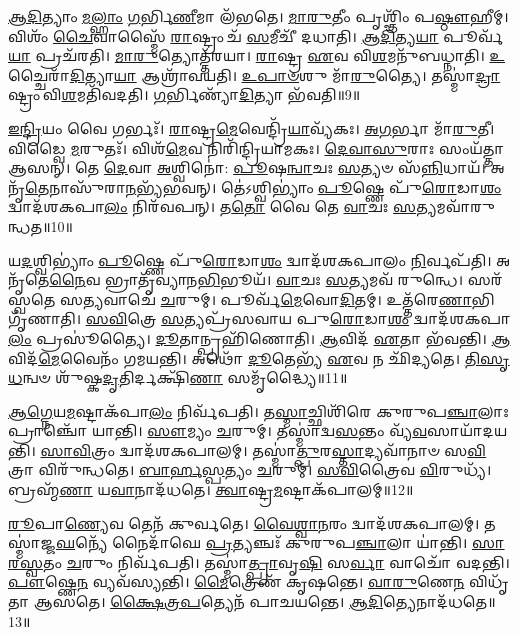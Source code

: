 \-\ul{𑌆}\-\-\ul{𑌦𑌿}\-𑌤𑍍𑌯𑌾𑌂 \ul{𑌮}\-\-\ul{𑌲𑍍}\-𑌹𑌾𑌂 \ul{𑌗}\-𑌰𑍍𑌭𑌿\-\ul{𑌣𑍀}\-𑌮𑌾 𑌲᳴𑌭𑌤𑍇।
\-\ul{𑌮𑌾}\-\-\ul{𑌰𑍁}\-𑌤𑍀𑌂 𑌪𑍃𑌶𑍍𑌞𑌿𑌂᳴ 𑌪\-\ul{𑌷𑍍𑌠𑍗}\-𑌹𑍀𑌮𑍍।
𑌵𑌿𑌶𑌂᳴ \ul{𑌚𑍈}\-𑌵𑌾𑌸𑍍𑌮𑍈᳴ \ul{𑌰𑌾}\-𑌷𑍍𑌟𑍍𑌰𑌂 𑌚᳴ \ul{𑌸}\-𑌮𑍀𑌚𑍀᳴ 𑌦𑌧𑌾𑌤𑌿।
\-\ul{𑌆}\-\-\ul{𑌦𑌿}\-𑌤𑍍𑌯\-\ul{𑌯𑌾} 𑌪𑍂𑌰𑍍𑌵᳴\-\ul{𑌯𑌾} 𑌪𑍍𑌰𑌚᳴𑌰𑌤𑌿।
\-\ul{𑌮𑌾}\-\-\ul{𑌰𑍁}\-𑌤𑍍𑌯𑍋𑌤𑍍𑌤᳴𑌰𑌯𑌾।
\-\ul{𑌰𑌾}\-𑌷𑍍𑌟𑍍𑌰 \ul{𑌏}\-𑌵 𑌵𑌿\-\ul{𑌶}\-𑌮𑌨𑍁᳴𑌬𑌧𑍍𑌨𑌾𑌤𑌿।
\-\ul{𑌉}\-𑌚𑍍𑌚𑍈𑌰𑌾᳴\-\ul{𑌦𑌿}\-𑌤𑍍𑌯𑌾\-\ul{𑌯𑌾} 𑌆𑌶𑍍𑌰𑌾᳴𑌵𑌯𑌤𑌿।
\-\ul{𑌉}\-\-\ul{𑌪𑌾}\-\-\ul{𑍞}\-𑌶𑍁 𑌮𑌾᳴\-\ul{𑌰𑍁}\-𑌤𑍍𑌯𑍈।
𑌤𑌸𑍍𑌮𑌾॑\-\ul{𑌦𑍍𑌰𑌾}\-𑌷𑍍𑌟𑍍𑌰𑌂 𑌵𑌿\-\ul{𑌶}\-𑌮𑌤𑌿᳴𑌵𑌦𑌤𑌿।
\-\ul{𑌗}\-𑌰𑍍𑌭𑌿𑌣𑍍𑌯𑌾᳴\-\ul{𑌦𑌿}\-𑌤𑍍𑌯𑌾 𑌭᳴𑌵𑌤𑌿॥9॥

\-\ul{𑌇}\-\-\ul{𑌨𑍍𑌦𑍍𑌰𑌿}\-𑌯𑌂 𑌵𑍈 𑌗𑌰𑍍𑌭𑌃᳴।
\-\ul{𑌰𑌾}\-𑌷𑍍𑌟𑍍𑌰\-\ul{𑌮𑍇}\-𑌵𑍇𑌨𑍍𑌦𑍍𑌰𑌿᳴\-\ul{𑌯𑌾}\-𑌵𑍍𑌯᳴𑌕𑌃।
\-\ul{𑌅}\-\-\ul{𑌗}\-𑌰𑍍𑌭𑌾 𑌮𑌾᳴\-\ul{𑌰𑍁}\-𑌤𑍀।
𑌵𑌿𑌡𑍍𑌵𑍈 \ul{𑌮}\-𑌰𑍁𑌤𑌃᳴।
𑌵𑌿𑌶᳴\-\ul{𑌮𑍇}\-𑌵 𑌨𑌿𑌰𑌿᳴𑌨𑍍𑌦𑍍𑌰𑌿𑌯𑌾𑌮𑌕𑌃।
\-\ul{𑌦𑍇}\-\-\ul{𑌵𑌾}\-\-\ul{𑌸𑍁}\-𑌰𑌾𑌃 𑌸𑌂𑌯᳴𑌤𑍍𑌤𑌾 𑌆𑌸𑌨𑍍।
𑌤𑍇 \ul{𑌦𑍇}\-𑌵𑌾 \ul{𑌅}\-𑌶𑍍𑌵𑌿𑌨𑍋॑: \ul{𑌪𑍂}\-𑌷\-\ul{𑌨𑍍𑌵𑌾}\-𑌚𑌃 \ul{𑌸}\-𑌤𑍍𑌯𑍞 𑌸᳴\-\ul{𑌨𑍍𑌨𑌿}\-𑌧𑌾𑌯᳴।
𑌅𑌨𑍃᳴\-\ul{𑌤𑍇}\-𑌨𑌾𑌸𑍁᳴𑌰𑌾\-\ul{𑌨}\-𑌭𑍍𑌯᳴𑌭𑌵𑌨𑍍।
𑌤𑍇॑𑌽𑌶𑍍𑌵𑌿𑌭𑍍𑌯𑌾𑌂॑ \ul{𑌪𑍂}\-𑌷𑍍𑌣𑍇 𑌪𑍁᳴\-\ul{𑌰𑍋}\-𑌡𑌾\-\ul{𑌶𑌂} 𑌦𑍍𑌵𑌾𑌦᳴𑌶𑌕𑌪𑌾\-\ul{𑌲𑌂} 𑌨𑌿𑌰᳴𑌵𑌪𑌨𑍍।
𑌤\-\ul{𑌤𑍋} 𑌵𑍈 𑌤𑍇 \ul{𑌵𑌾}\-𑌚𑌃 \ul{𑌸}\-𑌤𑍍𑌯𑌮𑌵𑌾᳴𑌰𑍁𑌨𑍍𑌧𑌤॥10॥

𑌯\-\ul{𑌦}\-𑌶𑍍𑌵𑌿𑌭𑍍𑌯𑌾𑌂॑ \ul{𑌪𑍂}\-𑌷𑍍𑌣𑍇 𑌪𑍁᳴\-\ul{𑌰𑍋}\-𑌡𑌾\-\ul{𑌶𑌂} 𑌦𑍍𑌵𑌾𑌦᳴𑌶𑌕𑌪𑌾𑌲𑌂 \ul{𑌨𑌿}\-𑌰𑍍𑌵𑌪᳴𑌤𑌿।
𑌅𑌨𑍃᳴𑌤𑍇\-\ul{𑌨𑍈}\-𑌵 𑌭𑍍𑌰𑌾𑌤𑍃᳴𑌵𑍍𑌯𑌾𑌨\-\ul{𑌭𑌿}\-𑌭𑍂𑌯᳴।
\-\ul{𑌵𑌾}\-𑌚𑌃 \ul{𑌸}\-𑌤𑍍𑌯𑌮𑌵᳴ 𑌰𑍁𑌨𑍍𑌧𑍇।
𑌸𑌰᳴𑌸𑍍𑌵𑌤𑍇 𑌸\-\ul{𑌤𑍍𑌯}\-𑌵𑌾𑌚𑍇᳴ \ul{𑌚}\-𑌰𑍁𑌮𑍍।
𑌪𑍂𑌰𑍍𑌵᳴\-\ul{𑌮𑍇}\-𑌵𑍋\-\ul{𑌦𑌿}\-𑌤𑌮𑍍।
𑌉𑌤𑍍𑌤᳴𑌰𑍇\-\ul{𑌣𑌾}\-𑌭𑌿 𑌗𑍃᳴𑌣𑌾𑌤𑌿।
\-\ul{𑌸}\-\-\ul{𑌵𑌿}\-𑌤𑍍𑌰𑍇 \ul{𑌸}\-𑌤𑍍𑌯𑌪𑍍𑌰᳴𑌸𑌵𑌾𑌯 𑌪𑍁\-\ul{𑌰𑍋}\-𑌡𑌾\-\ul{𑌶𑌂} 𑌦𑍍𑌵𑌾𑌦᳴𑌶𑌕𑌪𑌾\-\ul{𑌲𑌂} 𑌪𑍍𑌰𑌸𑍂॑𑌤𑍍𑌯𑍈।
\-\ul{𑌦𑍂}\-𑌤𑌾𑌨𑍍𑌪𑍍𑌰𑌹𑌿᳴𑌣𑍋𑌤𑌿।
\-\ul{𑌆}\-𑌵𑌿𑌦᳴ \ul{𑌏}\-𑌤𑌾 𑌭᳴𑌵𑌨𑍍𑌤𑌿।
\-\ul{𑌆}\-𑌵𑌿𑌦᳴\-\ul{𑌮𑍇}\-𑌵𑍈𑌨𑌂᳴ 𑌗𑌮𑌯𑌨𑍍𑌤𑌿।
𑌅𑌥𑍋᳴ \ul{𑌦𑍂}\-𑌤𑍇𑌭𑍍𑌯᳴ \ul{𑌏}\-𑌵 𑌨 𑌛𑌿᳴𑌦𑍍𑌯𑌤𑍇।
\-\ul{𑌤𑌿}\-\-\ul{𑌸𑍃}\-\-\ul{𑌧}\-𑌨𑍍𑌵𑍞 𑌶𑍁᳴𑌷𑍍𑌕\-\ul{𑌦𑍃}\-𑌤𑌿𑌰𑍍𑌦𑌕𑍍𑌷𑌿᳴\-\ul{𑌣𑌾} 𑌸𑌮𑍃᳴𑌦𑍍𑌧𑍍𑌯𑍈॥11॥\anuvakamend[\-\ul{𑌅}\-\-\ul{𑌰𑍍𑌧}\-\-\ul{𑌯}\-\-\ul{𑌤𑌿} \ul{𑌭}\-\-\ul{𑌵}\-\-\ul{𑌤𑍍𑌯}\-\-\ul{𑌰𑍁}\-\-\ul{𑌨𑍍𑌧}\-\-\ul{𑌤} \ul{𑌗}\-\-\ul{𑌮}\-\-\ul{𑌯}\-\-\ul{𑌨𑍍𑌤𑌿} 𑌦𑍍𑌵𑍇 𑌚᳴]

\-\ul{𑌆}\-\-\ul{𑌗𑍍𑌨𑍇}\-𑌯\-\ul{𑌮}\-𑌷𑍍𑌟𑌾\-𑌕᳴𑌪𑌾\-\ul{𑌲𑌂} 𑌨𑌿𑌰𑍍𑌵᳴𑌪𑌤𑌿।
𑌤\-\ul{𑌸𑍍𑌮𑌾}\-𑌚𑍍𑌛𑌿𑌶𑌿᳴𑌰𑍇 𑌕𑍁𑌰𑍁𑌪\-\ul{𑌞𑍍𑌚𑌾}\-𑌲𑌾𑌃 𑌪𑍍𑌰𑌾𑌞𑍍𑌚𑍋᳴ 𑌯𑌾𑌨𑍍𑌤𑌿।
\-\ul{𑌸𑍗}\-𑌮𑍍𑌯𑌂 \ul{𑌚}\-𑌰𑍁𑌮𑍍।
𑌤𑌸𑍍𑌮𑌾॑𑌦𑍍𑌵\-\ul{𑌸}\-𑌨𑍍𑌤𑌂 𑌵𑍍𑌯᳴\-\ul{𑌵}\-𑌸𑌾𑌯𑌾᳴𑌦𑌯𑌨𑍍𑌤𑌿।
\-\ul{𑌸𑌾}\-\-\ul{𑌵𑌿}\-𑌤𑍍𑌰𑌂 𑌦𑍍𑌵𑌾𑌦᳴𑌶𑌕𑌪𑌾𑌲𑌮𑍍।
𑌤𑌸𑍍𑌮𑌾॑\-\ul{𑌤𑍍𑌪𑍁}\-𑌰\-\ul{𑌸𑍍𑌤𑌾}\-𑌦𑍍𑌯𑌵𑌾᳴𑌨𑌾𑍞 𑌸\-\ul{𑌵𑌿}\-𑌤𑍍𑌰𑌾 𑌵𑌿𑌰𑍁᳴𑌨𑍍𑌧𑌤𑍇।
\-\ul{𑌬𑌾}\-\-\ul{𑌰𑍍}\-\-\ul{𑌹}\-\-\ul{𑌸𑍍𑌪}\-𑌤𑍍𑌯𑌂 \ul{𑌚}\-𑌰𑍁𑌮𑍍।
\-\ul{𑌸}\-\-\ul{𑌵𑌿}\-𑌤𑍍𑌰𑍈𑌵 \ul{𑌵𑌿}\-𑌰𑍁𑌧𑍍𑌯᳴।
𑌬𑍍𑌰𑌹𑍍𑌮᳴\-\ul{𑌣𑌾} 𑌯\-\ul{𑌵𑌾}\-𑌨𑌾𑌦᳴𑌧𑌤𑍇।
\-\ul{𑌤𑍍𑌵𑌾}\-𑌷𑍍𑌟𑍍𑌰\-\ul{𑌮}\-𑌷𑍍𑌟𑌾\-𑌕᳴𑌪𑌾𑌲𑌮𑍍॥12॥

\-\ul{𑌰𑍂}\-𑌪𑌾\-\ul{𑌣𑍍𑌯𑍇}\-𑌵 𑌤𑍇𑌨᳴ 𑌕𑍁𑌰𑍍𑌵𑌤𑍇।
\-\ul{𑌵𑍈}\-\-\ul{𑌶𑍍𑌵𑌾}\-\-\ul{𑌨}\-𑌰𑌂 𑌦𑍍𑌵𑌾𑌦᳴𑌶𑌕𑌪𑌾𑌲𑌮𑍍।
𑌤𑌸𑍍𑌮𑌾॑𑌜𑍍𑌜\-\ul{𑌘}\-𑌨𑍍𑌯𑍇᳴ 𑌨𑍈𑌦𑌾᳴𑌘𑍇 \ul{𑌪𑍍𑌰}\-𑌤𑍍𑌯𑌞𑍍𑌚𑌃᳴ 𑌕𑍁𑌰𑍁𑌪\-\ul{𑌞𑍍𑌚𑌾}\-𑌲𑌾 𑌯𑌾॑𑌨𑍍𑌤𑌿।
\-\ul{𑌸𑌾}\-\-\ul{𑌰}\-\-\ul{𑌸𑍍𑌵}\-𑌤𑌂 \ul{𑌚}\-𑌰𑍁𑌂 𑌨𑌿𑌰𑍍𑌵᳴𑌪𑌤𑌿।
𑌤𑌸𑍍𑌮𑌾॑\-\ul{𑌤𑍍𑌪𑍍𑌰𑌾}\-𑌵𑍃\-\ul{𑌷𑌿} 𑌸\-\ul{𑌰𑍍𑌵𑌾} 𑌵𑌾𑌚𑍋᳴ 𑌵𑌦𑌨𑍍𑌤𑌿।
\-\ul{𑌪𑍗}\-𑌷𑍍𑌣𑍇\-\ul{𑌨} 𑌵𑍍𑌯𑌵᳴𑌸𑍍𑌯𑌨𑍍𑌤𑌿।
\-\ul{𑌮𑍈}\-𑌤𑍍𑌰𑍇𑌣᳴ 𑌕𑍃𑌷𑌨𑍍𑌤𑍇।
\-\ul{𑌵𑌾}\-\-\ul{𑌰𑍁}\-𑌣𑍇\-\ul{𑌨} 𑌵𑌿𑌧𑍃᳴𑌤𑌾 𑌆𑌸𑌤𑍇।
\-\ul{𑌕𑍍𑌷𑍈}\-\-\ul{𑌤𑍍𑌰}\-\-\ul{𑌪}\-𑌤𑍍𑌯𑍇𑌨᳴ 𑌪𑌾𑌚𑌯𑌨𑍍𑌤𑍇।
\-\ul{𑌆}\-\-\ul{𑌦𑌿}\-𑌤𑍍𑌯𑍇𑌨𑌾𑌦᳴𑌧𑌤𑍇॥13॥

